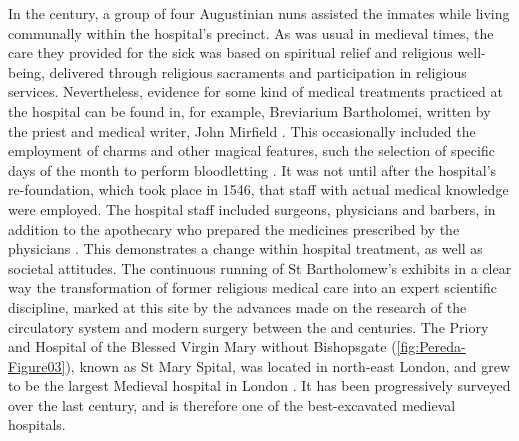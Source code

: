 \documentclass[%
	]{ijsra}
\renewcommand\AD{\xspace}
\begin{document}

In the  century\AD, a group of four Augustinian nuns assisted the inmates while living communally within the hospital’s precinct. As was usual in medieval times, the care they provided for the sick was based on spiritual relief and religious well-being, delivered through religious sacraments and participation in religious services. 
Nevertheless, evidence for some kind of medical treatments practiced at the hospital can be found in, for example, Breviarium Bartholomei, written by the priest and medical writer, John Mirfield \parencite[36-37]{Dainton_1961}. 
This occasionally included the employment of charms and other magical features, such the selection of specific days of the month to perform bloodletting \parencite[35-36]{Rider_2012}. 
It was not until after the hospital’s re-foundation, which took place in 1546, that staff with actual medical knowledge were employed. The hospital staff included surgeons, physicians and barbers, in addition to the apothecary who prepared the medicines prescribed by the physicians \parencite[38-39]{Dainton_1961}. This demonstrates a change within hospital treatment, as well as societal attitudes.  
The continuous running of St Bartholomew’s exhibits in a clear way the transformation of former religious medical care into an expert scientific discipline, marked at this site by the advances made on the research of the circulatory system and modern surgery between the  and  centuries.
\IJSRAseparator
{}
The Priory and Hospital of the Blessed Virgin Mary without Bishopsgate (\cref{fig:Pereda-Figure03}), %
known as St Mary Spital, was located in north-east London, and grew to be the largest Medieval hospital in London \parencite[60]{Bowers_2007}. It has been progressively surveyed over the last century, and is therefore one of the best-excavated medieval hospitals. 

\end{document}
